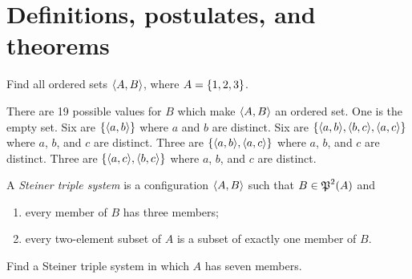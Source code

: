 \section{Definitions, postulates, and theorems}
\begin{exercise}
Find all ordered sets $\left\langle A,B\right\rangle$, where $A = \left\{1, 2, 3\right\}$.
\end{exercise}

\begin{solution}
There are 19 possible values for $B$ which make $\left\langle A,B\right\rangle$ an ordered set.
One is the empty set.
Six are $\left\{\left\langle a,b\right\rangle\right\}$ where $a$ and $b$ are distinct.
Six are $\set{\aprn{a,b},\aprn{b,c},\aprn{a,c}}$ where $a$, $b$, and $c$ are distinct.
Three are $\set{\aprn{a,b},\aprn{a,c}}$ where $a$, $b$, and $c$ are distinct.
Three are $\set{\aprn{a,c},\aprn{b,c}}$ where $a$, $b$, and $c$ are distinct.
\end{solution}

\begin{exercise}
A \textit{Steiner triple system} is a configuration $\left\langle A, B\right\rangle$ such that $B\in\operatorname{\mathfrak{P}}^2(A)$ and
\begin{enumerate}[label=(\alph*)]
    \item every member of $B$ has three members;
    \item every two-element subset of $A$ is a subset of exactly one member of $B$.
\end{enumerate}
Find a Steiner triple system in which $A$ has seven members.
\end{exercise}

